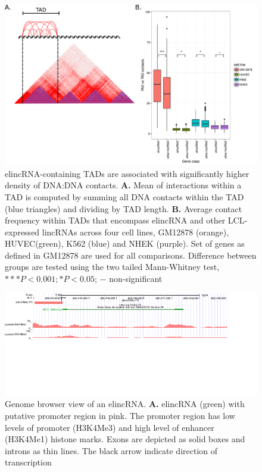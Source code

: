 \documentclass[11pt,a4paper]{report}
\begin{document}
\begin{figure}[ht]
	\includegraphics[width=1\textwidth]{Figures/5_TAD_TAD_contact.pdf}
	\caption{elincRNA-containing TADs are associated with significantly higher density of DNA:DNA contacts. \textbf{A.} Mean of interactions within a TAD is computed by summing all DNA contacts within the TAD (blue triangles) and dividing by TAD length. \textbf{B.} Average contact frequency within TADs that encompass elincRNA and other LCL-expressed lincRNAs across four cell lines, GM12878 (orange), HUVEC(green), K562 (blue) and NHEK (purple). Set of genes as defined in GM12878 are used for all comparisons. Difference between groups are tested using the two tailed Mann-Whitney test, $***P<0.001; *P<0.05$; $-$ non-significant}
	\label{TAD_TAD_contacts}
\end{figure}

\begin{figure}[ht]
	\includegraphics[width=1\textwidth]{Figures/7_merged_examples.pdf}
	\caption{Genome browser view of an elincRNA. \textbf{A.} elincRNA (green) with putative promoter region in pink. The promoter region has low levels of promoter (H3K4Me3) and high level of enhancer (H3K4Me1) histone marks. Exons are depicted as solid boxes and introns as thin lines. The black arrow indicate direction of transcription}
	\label{Genome_browser}
\end{figure}
\end{document}

